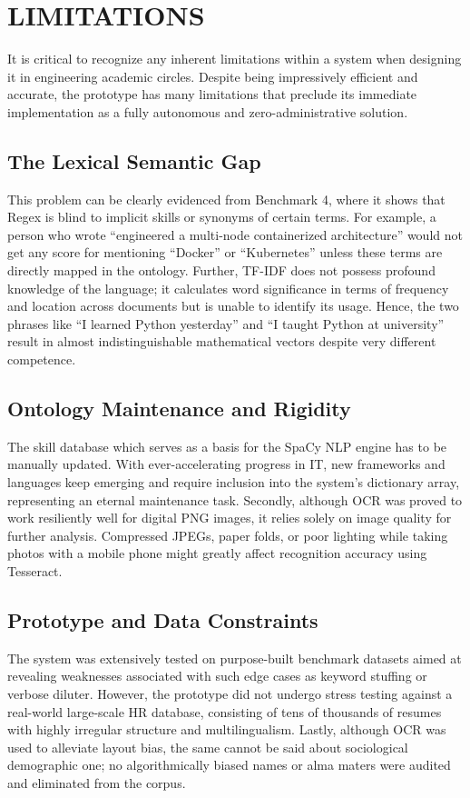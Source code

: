 \chapter{LIMITATIONS}

It is critical to recognize any inherent limitations within a system when designing it in engineering academic circles. Despite being impressively efficient and accurate, the prototype has many limitations that preclude its immediate implementation as a fully autonomous and zero-administrative solution.

\section{The Lexical Semantic Gap}
This problem can be clearly evidenced from Benchmark 4, where it shows that Regex is blind to implicit skills or synonyms of certain terms. For example, a person who wrote “engineered a multi-node containerized architecture” would not get any score for mentioning “Docker” or “Kubernetes” unless these terms are directly mapped in the ontology. Further, TF-IDF does not possess profound knowledge of the language; it calculates word significance in terms of frequency and location across documents but is unable to identify its usage. Hence, the two phrases like “I learned Python yesterday” and “I taught Python at university” result in almost indistinguishable mathematical vectors despite very different competence.

\section{Ontology Maintenance and Rigidity}
The skill database which serves as a basis for the SpaCy NLP engine has to be manually updated. With ever-accelerating progress in IT, new frameworks and languages keep emerging and require inclusion into the system’s dictionary array, representing an eternal maintenance task. Secondly, although OCR was proved to work resiliently well for digital PNG images, it relies solely on image quality for further analysis. Compressed JPEGs, paper folds, or poor lighting while taking photos with a mobile phone might greatly affect recognition accuracy using Tesseract.


\section{Prototype and Data Constraints}
The system was extensively tested on purpose-built benchmark datasets aimed at revealing weaknesses associated with such edge cases as keyword stuffing or verbose diluter. However, the prototype did not undergo stress testing against a real-world large-scale HR database, consisting of tens of thousands of resumes with highly irregular structure and multilingualism. Lastly, although OCR was used to alleviate layout bias, the same cannot be said about sociological demographic one; no algorithmically biased names or alma maters were audited and eliminated from the corpus.
